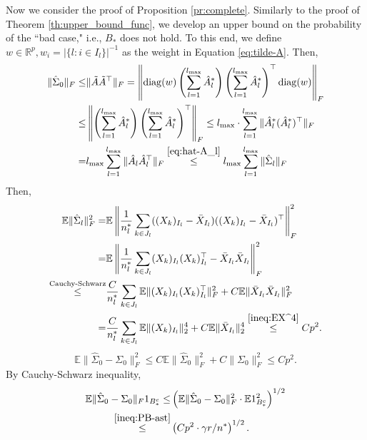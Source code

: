 \documentclass[11pt]{article}
\newcommand{\0}{{\mathbf{0}}}
\newcommand{\1}{{\mathbf{1}}}
\newcommand{\diag}{{\rm diag}}
\begin{document}
Now we consider the proof of Proposition \ref{pr:complete}. Similarly to the proof of Theorem \ref{th:upper_bound_func}, we develop an upper bound on the probability of the ``bad case," i.e., $B_\ast$ does not hold. To this end, we define $w\in \mathbb{R}^{p}, w_i = |\{l: i\in I_l\}|^{-1}$ as the weight in Equation \eqref{eq:tilde-A}. Then,
\begin{equation*}
\begin{split}
\|\hat{\Sigma}_0\|_F \leq &  \|\tilde{A}\tilde{A}^\top\|_F = \left\|\diag(w)\left(\sum_{l=1}^{l_{\max}}\hat{A}_l^\ast\right)\left(\sum_{l=1}^{l_{\max}}\hat{A}_l^\ast\right)^\top \diag(w)\right\|_F \\
\leq & \left\|\left(\sum_{l=1}^{l_{\max}}\hat{A}_l^\ast\right)\left(\sum_{l=1}^{l_{\max}}\hat{A}_l^\ast\right)^\top \right\|_F  \leq l_{\max} \cdot \sum_{l=1}^{l_{\max}} \|\hat{A}_l^\ast (\hat{A}_l^\ast)^\top\|_F \\
= & l_{\max}\sum_{l=1}^{l_{\max}}\|\hat{A}_l\hat{A}_l^\top\|_F \overset{\eqref{eq:hat-A_l}}{\leq} l_{\max} \sum_{l=1}^{l_{\max}} \|\hat{\Sigma}_l\|_F
\end{split}
\end{equation*}
Then,
\begin{equation*}
\begin{split}
\mathbb{E}\|\hat{\Sigma}_{l}\|_F^2 = & \mathbb{E}\left\|\frac{1}{n_l^\ast}\sum_{k\in J_l}((X_k)_{I_l} - \bar{X}_{I_l})((X_k)_{I_l} - \bar{X}_{I_l})^\top \right\|_F^2\\
= & \mathbb{E} \left\|\frac{1}{n_l^\ast}\sum_{k \in J_l}(X_k)_{I_l}(X_k)_{I_l}^\top - \bar{X}_{I_l} \bar{X}_{I_l}\right\|_F^2\\
\overset{\text{\text{Cauchy-Schwarz}}}{\leq} & \frac{C}{n_l^\ast} \sum_{k \in J_l} \mathbb{E} \|(X_k)_{I_l} (X_k)_{I_l}^\top\|_F^2 + C\mathbb{E}\|\bar{X}_{I_l}\bar{X}_{I_l}\|_F^2 \\
= & \frac{C}{n_l^\ast} \sum_{k \in J_l} \mathbb{E} \|(X_k)_{I_l}\|_2^4 + C\mathbb{E}\|\bar{X}_{I_l}\|_2^4 \overset{\eqref{ineq:EX^4}}{\leq} Cp^2. 
\end{split}
\end{equation*}
\begin{equation*}
\mathbb{E}\|\hat{\Sigma}_0 - \Sigma_0\|_F^2 \leq C\mathbb{E}\|\hat{\Sigma}_0\|_F^2 +  C\|\Sigma_0\|_F^2 \leq Cp^2.
\end{equation*}
By Cauchy-Schwarz inequality,
\begin{equation*}
\begin{split}
\mathbb{E}\|\hat{\Sigma}_0 - \Sigma_0\|_F 1_{B_\ast^c} \leq & \left(\mathbb{E}\|\hat{\Sigma}_0 - \Sigma_0\|_F^2 \cdot \mathbb{E} 1_{B_\ast^c}^2\right)^{1/2}\\
\overset{\eqref{ineq:PB-ast}}{\leq} & \left(Cp^2 \cdot \gamma r/n^\ast\right)^{1/2}.
\end{split}
\end{equation*}
\end{document}

